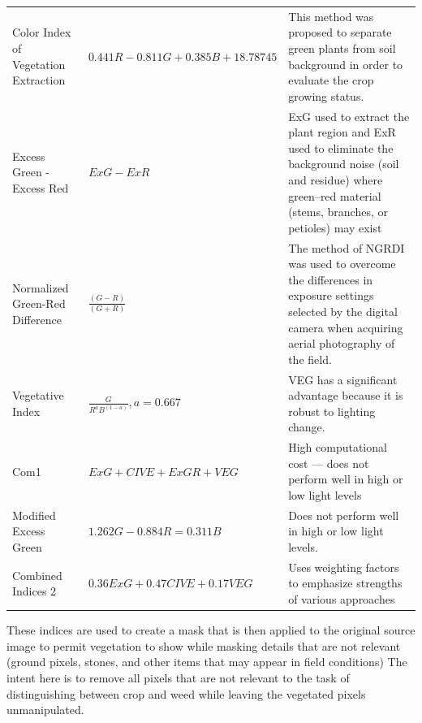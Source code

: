 \documentclass[letterpaper]{article}
\begin{document}
{{{\begin{longtable}{x{\dimexpr.25\tabcolsep}
                  x{\dimexpr.35\tabcolsep}
                  x{\dimexpr.4\tabcolsep}}
		Color Index of Vegetation Extraction      
		& $0.441 R - 0.811 G + 0.385 B + 18.78745$
		& This method was proposed to separate green plants from soil background in order to evaluate the crop growing status.
\tabularnewline\addlinespace

		Excess Green - Excess Red   
		& $ExG - ExR$ 
		& ExG used to extract the plant region and ExR used to eliminate the background noise (soil and residue) where green–red material (stems, branches, or petioles) may exist
\tabularnewline\addlinespace

		Normalized Green-Red Difference    
		& $\frac {(G - R)} {(G + R)}$ 
		& The method of NGRDI was used to overcome the differences in exposure settings selected by the digital camera when acquiring aerial photography of the field. 
\tabularnewline\addlinespace

		Vegetative Index      
		& $\frac {G} {R^aB^{(1-a)}}, a = 0.667$ 
		& VEG has a significant advantage because it is robust to lighting change.
\tabularnewline\addlinespace

		Com1   
		& $ExG + CIVE + ExGR + VEG$ 
		& High computational cost --- does not perform well in high or low light levels
\tabularnewline\addlinespace

		Modified Excess Green      
		& $1.262G - 0.884R = 0.311B$ 
		& Does not perform well in high or low light levels. 
\tabularnewline\addlinespace

		Combined Indices 2      
		& $0.36ExG + 0.47CIVE + 0.17VEG$ 
		& Uses weighting factors to emphasize strengths of various approaches
\label{table:segmentation}
\end{longtable}
}

These indices are used to create a mask that is then applied to the original source image to permit vegetation to show while masking details that are not relevant (ground pixels, stones, and other items that may appear in field conditions) The intent here is to remove all pixels that are not relevant to the task of distinguishing between crop and weed while leaving the vegetated pixels unmanipulated.

}}
\end{document}
